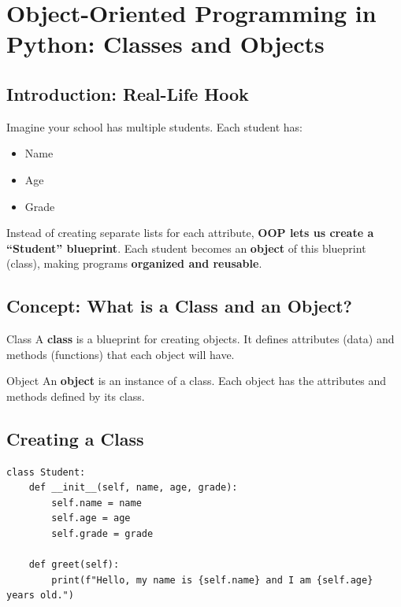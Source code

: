 \chapter{Object-Oriented Programming in Python: Classes and Objects}

\section{Introduction: Real-Life Hook}

Imagine your school has multiple students. Each student has:

\begin{itemize}
    \item Name  
    \item Age  
    \item Grade  
\end{itemize}

Instead of creating separate lists for each attribute, \textbf{OOP lets us create a ``Student'' blueprint}. Each student becomes an \textbf{object} of this blueprint (class), making programs \textbf{organized and reusable}.

\section{Concept: What is a Class and an Object?}

\begin{definition}{Class}
A \textbf{class} is a blueprint for creating objects. It defines attributes (data) and methods (functions) that each object will have.
\end{definition}

\begin{definition}{Object}
An \textbf{object} is an instance of a class. Each object has the attributes and methods defined by its class.
\end{definition}

\section{Creating a Class}

\begin{verbatim}
class Student:
    def __init__(self, name, age, grade):
        self.name = name
        self.age = age
        self.grade = grade

    def greet(self):
        print(f"Hello, my name is {self.name} and I am {self.age} years old.")
\end{verbatim}


